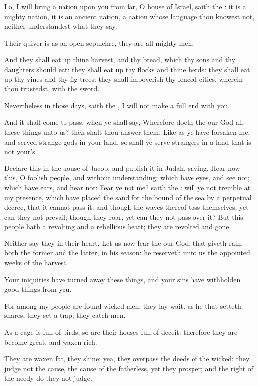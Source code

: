 \Verse Lo, I will bring a nation upon you from far, O house of Israel, saith the \LORD: it is a mighty nation, it is an ancient nation, a nation whose language thou knowest not, neither understandest what they say.

\Verse Their quiver is as an open sepulchre, they are all mighty men.

\Verse And they shall eat up thine harvest, and thy bread, which thy sons and thy daughters should eat: they shall eat up thy flocks and thine herds: they shall eat up thy vines and thy fig trees: they shall impoverish thy fenced cities, wherein thou trustedst, with the sword.

\Verse Nevertheless in those days, saith the \LORD, I will not make a full end with you.

\Verse And it shall come to pass, when ye shall say, Wherefore doeth the \LORD our God all these things unto us? then shalt thou answer them, Like as ye have forsaken me, and served strange gods in your land, so shall ye serve strangers in a land that is not your's.

\Verse Declare this in the house of Jacob, and publish it in Judah, saying, \Verse Hear now this, O foolish people, and without understanding; which have eyes, and see not; which have ears, and hear not: \Verse Fear ye not me? saith the \LORD: will ye not tremble at my presence, which have placed the sand for the bound of the sea by a perpetual decree, that it cannot pass it: and though the waves thereof toss themselves, yet can they not prevail; though they roar, yet can they not pass over it?  \Verse But this people hath a revolting and a rebellious heart; they are revolted and gone.

\Verse Neither say they in their heart, Let us now fear the \LORD our God, that giveth rain, both the former and the latter, in his season: he reserveth unto us the appointed weeks of the harvest.

\Verse Your iniquities have turned away these things, and your sins have withholden good things from you.

\Verse For among my people are found wicked men: they lay wait, as he that setteth snares; they set a trap, they catch men.

\Verse As a cage is full of birds, so are their houses full of deceit: therefore they are become great, and waxen rich.

\Verse They are waxen fat, they shine: yea, they overpass the deeds of the wicked: they judge not the cause, the cause of the fatherless, yet they prosper; and the right of the needy do they not judge.

